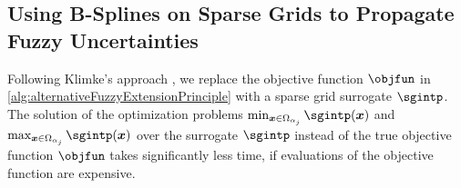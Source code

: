 \begin{algorithm}
  \begin{algorithmic}[1]
      \EndFor{}\vspace{-2mm}
    \EndFunction{}
  \end{algorithmic}
  \caption[Alternative fuzzy extension principle]{%
    Alternative fuzzy extension principle.
    Inputs are the number of $\alpha$ segments to use as discretization and
    the $d$ fuzzy intervals $\fuzzy{x}_1, \dotsc, \fuzzy{x}_d$
    (we have to be able to determine $\alpha$-cuts
    of these fuzzy input intervals).
    The output is an approximation to the output $\fuzzy{y}$
    of the alternative fuzzy extension principle
    (given by an approximation of its membership function $\memfun{y}$).%
  }%
  \label{alg:alternativeFuzzyExtensionPrinciple}%
\end{algorithm}



\subsection{Using B-Splines on Sparse Grids to Propagate Fuzzy Uncertainties}
\label{sec:553fuzzyBSplines}

Following Klimke's approach \cite{Klimke06Uncertainty},
we replace the objective function $\objfun$ in
\cref{alg:alternativeFuzzyExtensionPrinciple}
with a sparse grid surrogate $\sgintp$.
The solution of the optimization problems
$\min_{\*x \in \Omega_{\alpha_j}} \sgintp(\*x)$ and
$\max_{\*x \in \Omega_{\alpha_j}} \sgintp(\*x)$ over the
surrogate $\sgintp$ instead of the true objective function $\objfun$
takes significantly less time, if evaluations of the objective function
are expensive.

